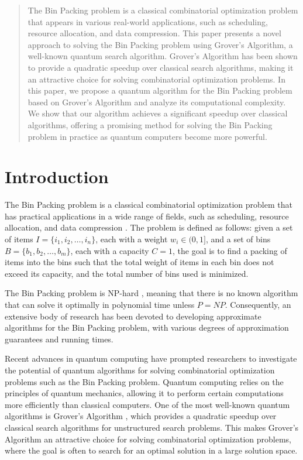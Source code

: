 \begin{abstract}
The Bin Packing problem is a classical combinatorial optimization problem that appears in various real-world applications, such as scheduling, resource allocation, and data compression. This paper presents a novel approach to solving the Bin Packing problem using Grover's Algorithm, a well-known quantum search algorithm. Grover's Algorithm has been shown to provide a quadratic speedup over classical search algorithms, making it an attractive choice for solving combinatorial optimization problems. In this paper, we propose a quantum algorithm for the Bin Packing problem based on Grover's Algorithm and analyze its computational complexity. We show that our algorithm achieves a significant speedup over classical algorithms, offering a promising method for solving the Bin Packing problem in practice as quantum computers become more powerful.

\end{abstract}

\section{Introduction}
The Bin Packing problem is a classical combinatorial optimization problem that has practical applications in a wide range of fields, such as scheduling, resource allocation, and data compression \cite{garey1978analysis}. The problem is defined as follows: given a set of items $I = \{i_1, i_2, \ldots, i_n\}$, each with a weight $w_i \in (0, 1]$, and a set of bins $B = \{b_1, b_2, \ldots, b_m\}$, each with a capacity $C = 1$, the goal is to find a packing of items into the bins such that the total weight of items in each bin does not exceed its capacity, and the total number of bins used is minimized.

The Bin Packing problem is NP-hard \cite{garey1978analysis}, meaning that there is no known algorithm that can solve it optimally in polynomial time unless $P=NP$. Consequently, an extensive body of research has been devoted to developing approximate algorithms for the Bin Packing problem, with various degrees of approximation guarantees and running times.

Recent advances in quantum computing have prompted researchers to investigate the potential of quantum algorithms for solving combinatorial optimization problems such as the Bin Packing problem. Quantum computing relies on the principles of quantum mechanics, allowing it to perform certain computations more efficiently than classical computers. One of the most well-known quantum algorithms is Grover's Algorithm \cite{grover1996fast}, which provides a quadratic speedup over classical search algorithms for unstructured search problems. This makes Grover's Algorithm an attractive choice for solving combinatorial optimization problems, where the goal is often to search for an optimal solution in a large solution space.

